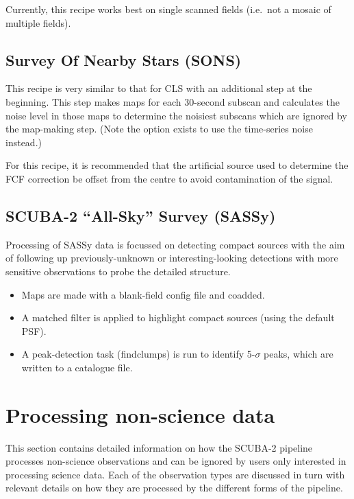 \documentclass[twoside,11pt]{article}
\newcommand{\xlabel}[1]{}
\renewcommand{\_}{\texttt{\symbol{95}}}
\newcommand{\task}[1]{\textsf{#1}}
\begin{document}
Currently, this recipe works best on single scanned fields (i.e.\ not
a mosaic of multiple fields).

\subsection{Survey Of Nearby Stars (SONS)}

This recipe is very similar to that for CLS with an additional step at
the beginning. This step makes maps for each 30-second subscan and
calculates the noise level in those maps to determine the noisiest
subscans which are ignored by the map-making step. (Note the option
exists to use the time-series noise instead.)

For this recipe, it is recommended that the artificial source used to
determine the FCF correction be offset from the centre to avoid
contamination of the signal.

\subsection{SCUBA-2 ``All-Sky'' Survey (SASSy)}

Processing of SASSy data is focussed on detecting compact sources with
the aim of following up previously-unknown or interesting-looking
detections with more sensitive observations to probe the detailed
structure.

\begin{itemize}
\item Maps are made with a blank-field config file and coadded.
\item A matched filter is applied to highlight compact sources (using
  the default PSF).
\item A peak-detection task (\task{findclumps}) is run to identify
  5-$\sigma$ peaks, which are written to a catalogue file.
\end{itemize}

\section{\xlabel{nonscience}Processing non-science data\label{se:nonsci}}

This section contains detailed information on how the SCUBA-2 pipeline
processes non-science observations and can be ignored by users only
interested in processing science data. Each of the observation types
are discussed in turn with relevant details on how they are processed
by the different forms of the pipeline.
\end{document}
